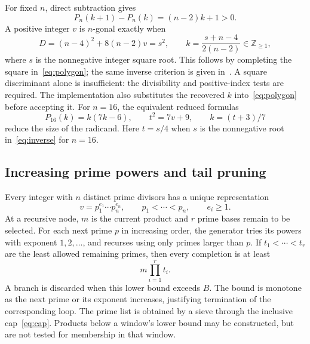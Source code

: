 \documentclass[11pt]{article}
\theoremstyle{remark}
\begin{document}
For fixed $n$, direct subtraction gives
\begin{equation}\label{eq:monotone}
 P_n(k+1)-P_n(k)=(n-2)k+1>0.
\end{equation}
A positive integer $v$ is $n$-gonal exactly when
\begin{equation}\label{eq:inverse}
 D=(n-4)^2+8(n-2)v=s^2,\qquad
 k=\frac{s+n-4}{2(n-2)}\in\mathbb Z_{\geq1},
\end{equation}
where $s$ is the nonnegative integer square root. This follows by completing
the square in~\eqref{eq:polygon}; the same inverse criterion is given
in~\cite{polygonal}. A square discriminant alone is insufficient: the
divisibility and positive-index tests are required. The implementation also
substitutes the recovered $k$ into~\eqref{eq:polygon} before accepting it.
For $n=16$, the equivalent reduced formulas
\begin{equation}\label{eq:16}
 P_{16}(k)=k(7k-6),\qquad t^2=7v+9,\qquad k=(t+3)/7
\end{equation}
reduce the size of the radicand. Here $t=s/4$ when $s$ is the
nonnegative root in~\eqref{eq:inverse} for $n=16$.

\subsection{Increasing prime powers and tail pruning}
Every integer with $n$ distinct prime divisors has a unique representation
\begin{equation}\label{eq:tuple}
 v=p_1^{e_1}\cdots p_n^{e_n},\qquad
 p_1<\cdots<p_n,\qquad e_i\geq1.
\end{equation}
At a recursive node, $m$ is the current product and $r$ prime bases remain
to be selected. For each next prime $p$ in increasing order, the generator
tries its powers with exponent $1,2,\ldots$, and recurses using only primes
larger than $p$. If $t_1<\cdots<t_r$ are the least allowed remaining primes,
then every completion is at least
\begin{equation}\label{eq:tail}
 m\prod_{i=1}^r t_i.
\end{equation}
A branch is discarded when this lower bound exceeds $B$. The bound is
monotone as the next prime or its exponent increases, justifying termination
of the corresponding loop. The prime list is obtained by a sieve through
the inclusive cap~\eqref{eq:cap}. Products below a window's lower bound
may be constructed, but are not tested for membership in that window.
\end{document}
